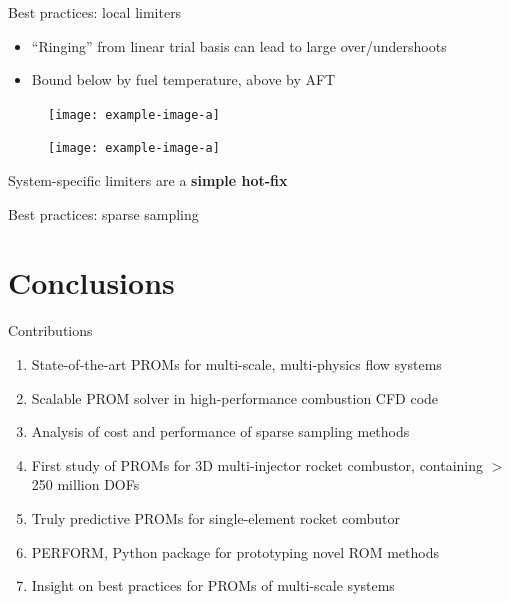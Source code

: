 \documentclass[]{beamer}
\begin{document}
\begin{frame}{Best practices: local limiters}
	\begin{itemize}
		\item ``Ringing'' from linear trial basis can lead to large over/undershoots
		\item Bound below by fuel temperature, above by AFT 
	\end{itemize}
	\begin{figure}
		\centering
		\begin{minipage}{0.4\linewidth}
			\texttt{[image: example-image-a]}
		\end{minipage}
		\begin{minipage}{0.4\linewidth}
			\texttt{[image: example-image-a]}
		\end{minipage}
	\end{figure}
	\begin{tcolorbox}[colframe=blue!50!white,halign=center]
		System-specific limiters are a \textbf{simple hot-fix}
	\end{tcolorbox}
\end{frame}

\begin{frame}{Best practices: sparse sampling}
	
\end{frame}

\section*{Conclusions}

\begin{frame}{Contributions}
    \begin{enumerate}
        \item State-of-the-art PROMs for multi-scale, multi-physics flow systems
        \item Scalable PROM solver in high-performance combustion CFD code
        \item Analysis of cost and performance of sparse sampling methods
        \item First study of PROMs for 3D multi-injector rocket combustor, containing $>$ 250 million DOFs
        \item Truly predictive PROMs for single-element rocket combutor
        \item PERFORM, Python package for prototyping novel ROM methods
        \item Insight on best practices for PROMs of multi-scale systems
    \end{enumerate}
\end{frame}
\end{document}

